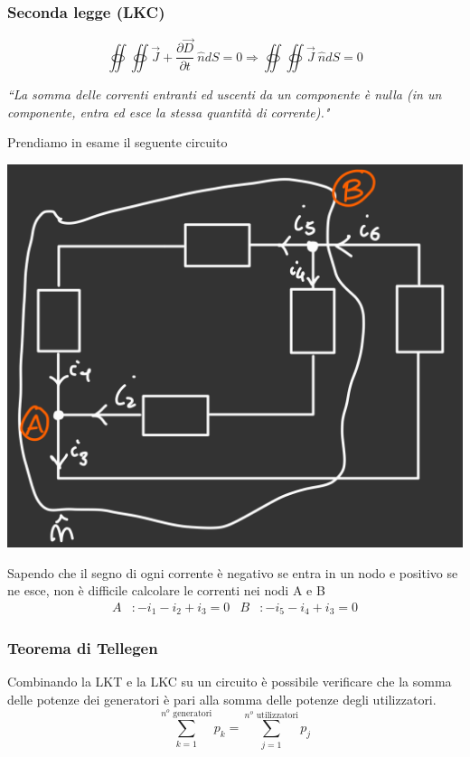 \documentclass{article}
\begin{document}
\subsubsection{Seconda legge (LKC)}
\[
    \oiint \oiint \vec J + \dfrac{\partial \vec D}{\partial t} \ \hat n dS = 0 \Longrightarrow \oiint \oiint \vec J \ \hat n dS = 0
\]
\begin{center}
    \textit{“La somma delle correnti entranti ed uscenti da un componente è nulla (in un
componente, entra ed esce la stessa quantità di corrente)."}
\end{center}
Prendiamo in esame il seguente circuito
\begin{center}
    \includegraphics[scale=0.25]{Image/Esempio LKC.png}
\end{center}
Sapendo che il segno di ogni corrente è negativo se entra in un nodo e positivo se ne esce, non è difficile calcolare le correnti nei nodi A e B 
\begin{align*}
    A&: -i_1 -i_2+i_3=0 & B&: -i_5-i_4+i_3=0
\end{align*}


\subsubsection{Teorema di Tellegen}
Combinando la LKT e la LKC su un circuito è possibile verificare che la somma delle potenze dei generatori è pari alla somma delle potenze degli utilizzatori.
\[
    \sum_{k=1}^{n^o \text{ generatori}} p_k = \sum_{j=1}^{n^o \text{ utilizzatori}} p_j
\]
\end{document}
